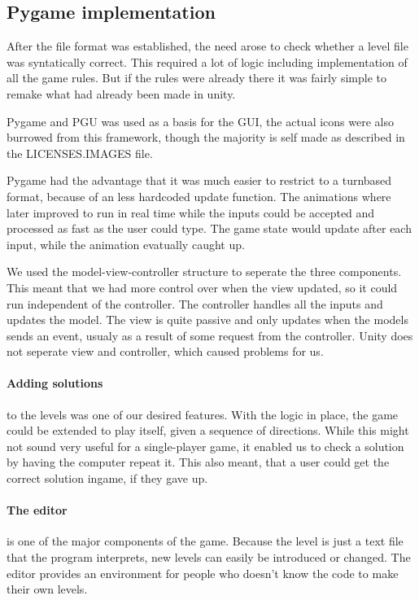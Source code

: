 \subsection{Pygame implementation}
After the file format was established, the need arose to check whether
a level file was syntatically correct. This required a lot of logic including
implementation of all the game rules. But if the rules were already there
it was fairly simple to remake what had already been made in unity.

Pygame and PGU was used as a basis for the GUI, the actual icons were
also burrowed from this framework, though the majority is self made as
described in the LICENSES.IMAGES file.

Pygame had the advantage that it was much easier to restrict to a
turnbased format, because of an less hardcoded update function. The
animations where later improved to run in real time while the inputs could 
be accepted and processed as fast as the user could type. The game state
would update after each input, while the animation evatually caught up.

We used the model-view-controller structure to seperate the three
components. This meant that we had more control over when the view
updated, so it could run independent of the controller. The controller
handles all the inputs and updates the model. The view is quite passive
and only updates when the models sends an event, usualy as a result
 of some request from the controller. Unity does not seperate view
 and controller, which caused problems for us.

\paragraph{Adding solutions}
to the levels was one of our desired features. With the logic in place,
the game could be extended to play itself, given a sequence of directions.
While this might not sound very useful for a single-player game, it enabled
us to check a solution by having the computer repeat it. This also meant,
that a user could get the correct solution ingame, if they gave up.

\paragraph{The editor} is one of the major components of the game.
Because the level is just a text file that the program interprets, new
levels can easily be introduced or changed. The editor provides an
environment for people who doesn't know the code to make their own
levels.

